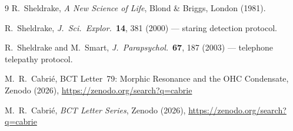 \documentclass[aps,prl,twocolumn,superscriptaddress,floatfix]{revtex4-2}
\begin{document}
\begin{thebibliography}{9}
R.~Sheldrake, \textit{A New Science of Life},
Blond \& Briggs, London (1981).

R.~Sheldrake, \textit{J.\ Sci.\ Explor.}~\textbf{14}, 381 (2000)
--- staring detection protocol.

R.~Sheldrake and M.~Smart,
\textit{J.\ Parapsychol.}~\textbf{67}, 187 (2003)
--- telephone telepathy protocol.

M.~R.~Cabri\'{e}, BCT Letter~79: Morphic Resonance and the OHC
Condensate, Zenodo (2026),
\url{https://zenodo.org/search?q=cabrie}

M.~R.~Cabri\'{e}, \textit{BCT Letter Series}, Zenodo (2026),
\url{https://zenodo.org/search?q=cabrie}
\end{thebibliography}
\end{document}

